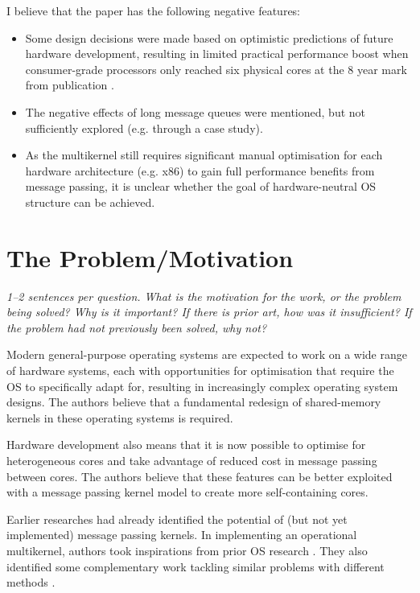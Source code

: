 \documentclass[11pt]{article}
\begin{document}
I believe that the paper has the following negative features:
\begin{itemize}
	\item Some design decisions were made based on optimistic predictions of future hardware development, resulting in limited practical performance boost when consumer-grade processors only reached six physical cores at the 8 year mark from publication \cite{8700k}.
	\item The negative effects of long message queues were mentioned, but not sufficiently explored (e.g. through a case study).
	\item As the multikernel still requires significant manual optimisation for each hardware architecture (e.g. x86) to gain full performance benefits from message passing, it is unclear whether the goal of hardware-neutral OS structure can be achieved. 
\end{itemize}

\section*{The Problem/Motivation}
\textsl{1--2 sentences per question. What is the motivation for the work, or the problem being solved? Why is it important? If there is prior art, how was it insufficient? If the problem had not previously been solved, why not?}

Modern general-purpose operating systems are expected to work on a wide range of hardware systems, each with opportunities for optimisation that require the OS to specifically adapt for, resulting in increasingly complex operating system designs. The authors believe that a fundamental redesign of shared-memory kernels in these operating systems is required.

Hardware development also means that it is now possible to optimise for heterogeneous cores and take advantage of reduced cost in message passing between cores. The authors believe that these features can be better exploited with a message passing kernel model to create more self-containing cores.

Earlier researches \cite{chaves1993kernel, lauer1979duality} had already identified the potential of (but not yet implemented) message passing kernels. In implementing an operational multikernel, authors took inspirations from prior OS research \cite{liedtke1995micro, gamsa1999tornado, tanenbaum1985distributed}. They also identified some complementary work tackling similar problems with different methods \cite{shelepov2008scheduling, wentzlaff2009factored}.
\end{document}

